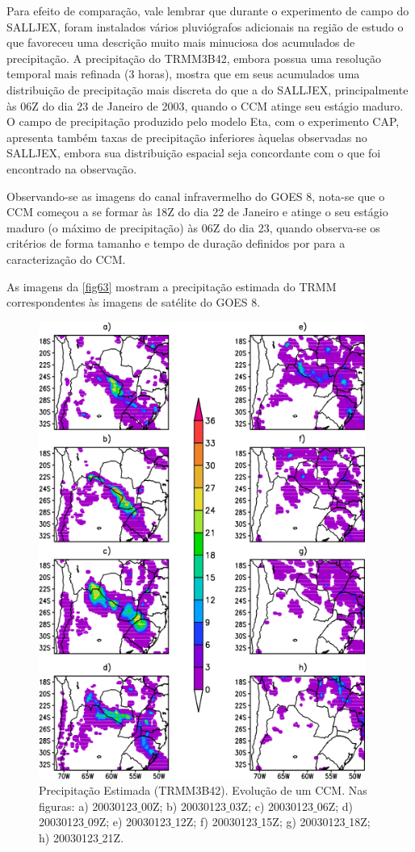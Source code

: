 Para efeito de comparação, vale lembrar que durante o experimento de campo do SALLJEX, foram instalados vários pluviógrafos adicionais na região de estudo o que favoreceu uma descrição muito mais minuciosa dos acumulados de precipitação. A precipitação do TRMM3B42, embora possua uma resolução temporal mais refinada (3 horas), mostra que em seus acumulados uma distribuição de precipitação mais discreta do que a do SALLJEX, principalmente às 06Z do dia 23 de Janeiro de 2003, quando o CCM atinge seu estágio maduro. O campo de precipitação produzido pelo modelo Eta, com o experimento CAP, apresenta também taxas de precipitação inferiores àquelas observadas no SALLJEX, embora sua distribuição espacial seja concordante com o que foi encontrado na observação.

Observando-se as imagens do canal infravermelho do GOES 8, nota-se que o CCM começou a se formar às 18Z do dia 22 de Janeiro e atinge o seu estágio maduro (o máximo de precipitação) às 06Z do dia 23, quando observa-se os critérios de forma tamanho e tempo de duração definidos por  para a caracterização do CCM.

As imagens da \autoref{fig63} mostram a precipitação estimada do TRMM correspondentes às imagens de satélite do GOES 8.

\begin{figure}[!hpb]
\centering
\includegraphics[height=15cm]{./figs/prec_trmm3b42.png}
\caption{Precipitação Estimada (TRMM3B42). Evolução de um CCM. Nas figuras: a) 20030123$\_$00Z; b) 20030123$\_$03Z; c) 20030123$\_$06Z; d) 20030123$\_$09Z; e) 20030123$\_$12Z; f) 20030123$\_$15Z; g) 20030123$\_$18Z; h) 20030123$\_$21Z.}
\label{fig63}
\end{figure}

